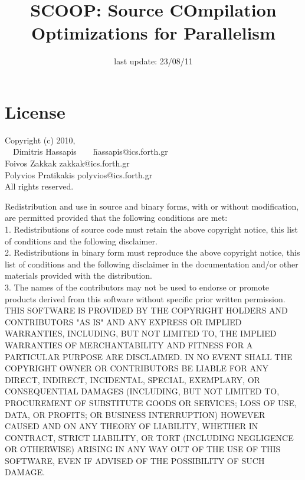 \documentclass[letterpaper]{article}
\begin{document}
\title{SCOOP: Source COmpilation Optimizations for Parallelism \scoopversion}
\date{last update: 23/08/11}
\maketitle

\section{License}

\begin{tabbing}
Copyright (c) 2010,\\
\ \ \=Dimitris Hassapis\ \ \ \ \=hassapis@ics.forth.gr\\
\>Foivos Zakkak        \>zakkak@ics.forth.gr\\
\>Polyvios Pratikakis  \>polyvios@ics.forth.gr\\
All rights reserved.
\end{tabbing}

Redistribution and use in source and binary forms, with or without
modification, are permitted provided that the following conditions are
met:\\

1. Redistributions of source code must retain the above copyright
notice, this list of conditions and the following disclaimer.\\

2. Redistributions in binary form must reproduce the above copyright
notice, this list of conditions and the following disclaimer in the
documentation and/or other materials provided with the distribution.\\

3. The names of the contributors may not be used to endorse or promote
products derived from this software without specific prior written
permission.\\

THIS SOFTWARE IS PROVIDED BY THE COPYRIGHT HOLDERS AND CONTRIBUTORS "AS
IS" AND ANY EXPRESS OR IMPLIED WARRANTIES, INCLUDING, BUT NOT LIMITED
TO, THE IMPLIED WARRANTIES OF MERCHANTABILITY AND FITNESS FOR A
PARTICULAR PURPOSE ARE DISCLAIMED. IN NO EVENT SHALL THE COPYRIGHT OWNER
OR CONTRIBUTORS BE LIABLE FOR ANY DIRECT, INDIRECT, INCIDENTAL, SPECIAL,
EXEMPLARY, OR CONSEQUENTIAL DAMAGES (INCLUDING, BUT NOT LIMITED TO,
PROCUREMENT OF SUBSTITUTE GOODS OR SERVICES; LOSS OF USE, DATA, OR
PROFITS; OR BUSINESS INTERRUPTION) HOWEVER CAUSED AND ON ANY THEORY OF
LIABILITY, WHETHER IN CONTRACT, STRICT LIABILITY, OR TORT (INCLUDING
NEGLIGENCE OR OTHERWISE) ARISING IN ANY WAY OUT OF THE USE OF THIS
SOFTWARE, EVEN IF ADVISED OF THE POSSIBILITY OF SUCH DAMAGE.\\
\end{document}
